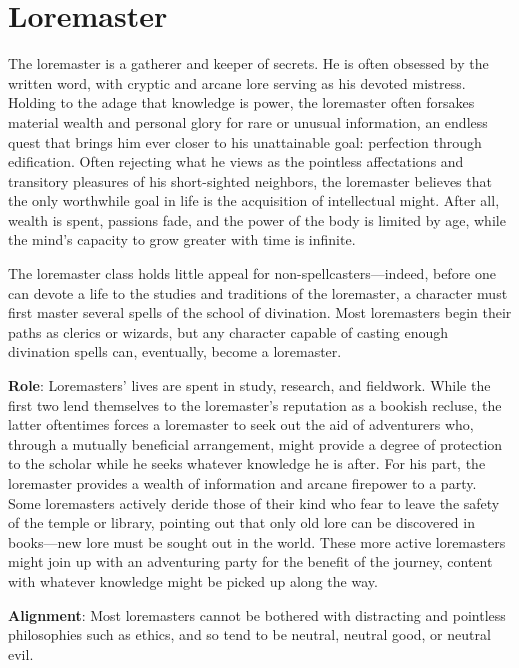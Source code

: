 \section{Loremaster}

\label{f0}				
The loremaster is a gatherer and keeper of secrets. He is often obsessed by the written word, with cryptic and arcane lore serving as his devoted mistress. Holding to the adage that knowledge is power, the loremaster often forsakes material wealth and personal glory for rare or unusual information, an endless quest that brings him ever closer to his unattainable goal: perfection through edification. Often rejecting what he views as the pointless affectations and transitory pleasures of his short-sighted neighbors, the loremaster believes that the only worthwhile goal in life is the acquisition of intellectual might. After all, wealth is spent, passions fade, and the power of the body is limited by age, while the mind's capacity to grow greater with time is infinite.
				
The loremaster class holds little appeal for non-spellcasters---indeed, before one can devote a life to the studies and traditions of the loremaster, a character must first master several spells of the school of divination. Most loremasters begin their paths as clerics or wizards, but any character capable of casting enough divination spells can, eventually, become a loremaster.
				
\textbf{Role}: Loremasters' lives are spent in study, research, and fieldwork. While the first two lend themselves to the loremaster's reputation as a bookish recluse, the latter oftentimes forces a loremaster to seek out the aid of adventurers who, through a mutually beneficial arrangement, might provide a degree of protection to the scholar while he seeks whatever knowledge he is after. For his part, the loremaster provides a wealth of information and arcane firepower to a party. Some loremasters actively deride those of their kind who fear to leave the safety of the temple or library, pointing out that only old lore can be discovered in books---new lore must be sought out in the world. These more active loremasters might join up with an adventuring party for the benefit of the journey, content with whatever knowledge might be picked up along the way. 
				
\textbf{Alignment}: Most loremasters cannot be bothered with distracting and pointless philosophies such as ethics, and so tend to be neutral, neutral good, or neutral evil.
				
